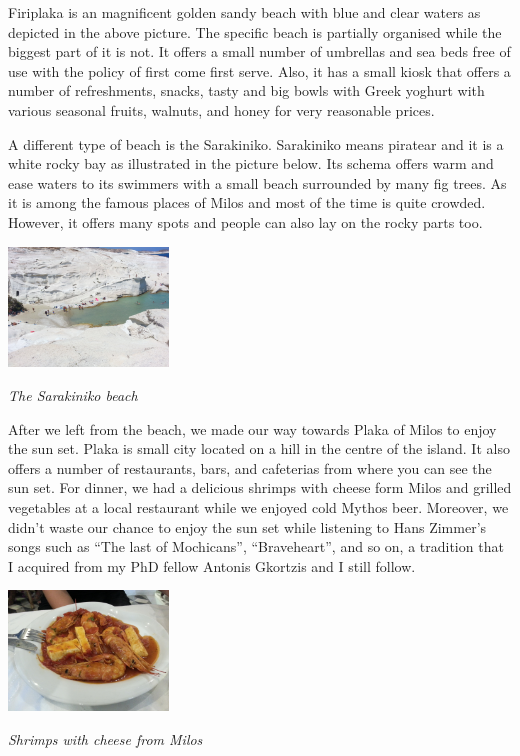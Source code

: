 \documentclass[10pt,a4paper]{article} %
\begin{document}
\begin{multicols}{3}
Firiplaka is an magnificent golden sandy beach with blue and clear waters 
as depicted in the above picture. 
The specific beach is partially organised while the biggest part of it is not. 
It offers a small number of umbrellas and sea beds free of use with the policy 
of first come first serve. 
Also, it has a small kiosk that offers a number of refreshments, snacks, tasty 
and big bowls with Greek yoghurt with various seasonal fruits, walnuts, and honey 
for very reasonable prices. 


A different type of beach is the Sarakiniko. 
Sarakiniko means piratear and it is a white rocky bay as illustrated in the 
picture below. 
Its schema offers warm and ease waters to its swimmers with a small beach surrounded 
by many fig trees. 
As it is among the famous places of Milos and most of the time is quite crowded. 
However, it offers many spots and people can also lay on the rocky parts too.


\begin{center}
	\includegraphics[width=0.32\textwidth]{media/milos_beach_2.jpg}
	\par\textit{The Sarakiniko beach}
\end{center} 


After we left from the beach, we made our way towards Plaka of Milos to enjoy the 
sun set. 
Plaka is small city located on a hill in the centre of the island. 
It also offers a number of restaurants, bars, and cafeterias from where you can 
see the sun set. 
For dinner, we had a delicious shrimps with cheese form Milos and grilled vegetables 
at a local restaurant while we enjoyed cold Mythos beer. 
Moreover, we didn't waste our chance to enjoy the sun set while listening to Hans 
Zimmer's songs such as ``The last of Mochicans'', ``Braveheart'', and so on, a 
tradition that I acquired from my PhD fellow Antonis Gkortzis and I still follow.


\begin{center}
	\includegraphics[width=0.32\textwidth]{media/milos_food.jpg}
	\par\textit{Shrimps with cheese from Milos}
\end{center}




\end{multicols}
\end{document}
